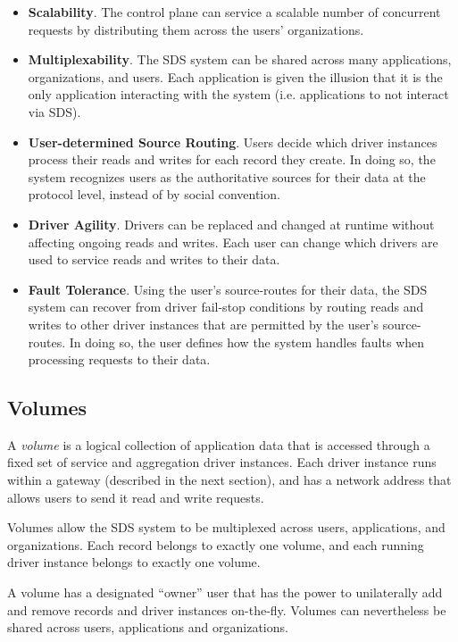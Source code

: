 \begin{itemize}
    \item \textbf{Scalability}.  The control plane can service a scalable number
       of concurrent requests by distributing them across the users'
       organizations.
    \item \textbf{Multiplexability}.  The SDS system can be shared across many
       applications, organizations, and users.  Each application is given the
       illusion that it is the only application interacting with the system
       (i.e. applications to not interact via SDS).
    \item \textbf{User-determined Source Routing}.  Users decide which driver
       instances process their reads and writes for each record they create.
       In doing so, the system recognizes users as the authoritative sources for
       their data at the protocol level, instead of by social convention.
    \item \textbf{Driver Agility}.  Drivers can be replaced and changed at
       runtime without affecting ongoing reads and writes.  Each user can change
       which drivers are used to service reads and writes to their data.
    \item \textbf{Fault Tolerance}.  Using the user's source-routes for their
       data, the SDS system can recover from driver fail-stop conditions by
       routing reads and writes to other driver instances that are permitted by
       the user's source-routes.  In doing so, the user defines how the system
       handles faults when processing requests to their data.
\end{itemize}

\subsection{Volumes}

A \emph{volume} is a logical collection of
application data that is accessed through a fixed set of service and aggregation
driver instances.  Each driver instance runs within a gateway
(described in the next section), and has a
network address that allows users to send it read and write
requests.  

Volumes allow the SDS system to be multiplexed across users, applications, and
organizations.  Each record belongs to exactly one volume, and each running
driver instance belongs to exactly one volume.

A volume has a designated ``owner'' user that has the power to unilaterally
add and remove records and driver instances on-the-fly.  Volumes can
nevertheless be shared across users, applications and organizations.

